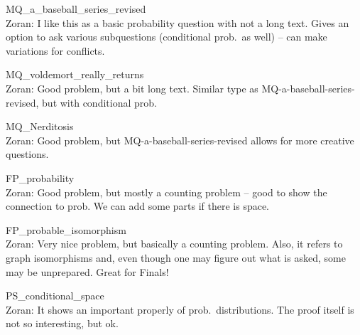 \documentclass[quiz]{mcs}
\begin{document}
\begin{staffnotes}
MQ\_a\_baseball\_series\_revised\\
Zoran: I like this as a basic probability question with not a long text. Gives an option to ask various
subquestions (conditional prob.\ as well) -- can make variations for conflicts.
\end{staffnotes}


\begin{staffnotes}
MQ\_voldemort\_really\_returns\\
Zoran: Good problem, but a bit long text. Similar type as MQ-a-baseball-series-revised, but with
conditional prob.
\end{staffnotes}

\begin{staffnotes}
MQ\_Nerditosis\\
Zoran: Good problem, but MQ-a-baseball-series-revised allows for more creative questions.
\end{staffnotes}

\begin{staffnotes}
FP\_probability\\
Zoran: Good problem, but mostly a counting problem -- good to show the connection to prob.
We can add some parts if there is space.
\end{staffnotes}

\begin{staffnotes}
FP\_probable\_isomorphism\\
Zoran: Very nice problem, but basically a counting problem.
Also, it refers to graph isomorphisms and, even though one may figure out what is asked,
some may be unprepared. Great for Finals!
\end{staffnotes}

\begin{staffnotes}
PS\_conditional\_space\\
Zoran: It shows an important properly of prob.\ distributions. The proof itself
is not so interesting, but ok.
\end{staffnotes}
\end{document}
